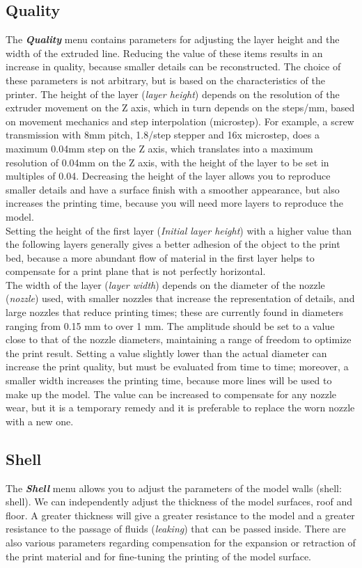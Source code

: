 \subsection{Quality}
The \emph{\textbf{Quality}} menu contains parameters for adjusting the layer height and the width of the extruded line. Reducing the value of these items results in an increase in quality, because smaller details can be reconstructed. The choice of these parameters is not arbitrary, but is based on the characteristics of the printer.
The height of the layer (\emph{layer height}) depends on the resolution of the extruder movement on the Z axis, which in turn depends on the steps/mm, based on movement mechanics and step interpolation (microstep). For example, a screw transmission with 8mm pitch, 1.8/step stepper and 16x microstep, does a maximum 0.04mm step on the Z axis, which translates into a maximum resolution of 0.04mm on the Z axis, with the height of the layer to be set in multiples of 0.04. Decreasing the height of the layer allows you to reproduce smaller details and have a surface finish with a smoother appearance, but also increases the printing time, because you will need more layers to reproduce the model.\\
Setting the height of the first layer (\emph{Initial layer height}) with a higher value than the following layers generally gives a better adhesion of the object to the print bed, because a more abundant flow of material in the first layer helps to compensate for a print plane that is not perfectly horizontal. \\
The width of the layer (\emph{layer width}) depends on the diameter of the nozzle (\emph{nozzle}) used, with smaller nozzles that increase the representation of details, and large nozzles that reduce printing times; these are currently found in diameters ranging from 0.15 mm to over 1 mm. The amplitude should be set to a value close to that of the nozzle diameters, maintaining a range of freedom to optimize the print result. Setting a value slightly lower than the actual diameter can increase the print quality, but must be evaluated from time to time; moreover, a smaller width increases the printing time, because more lines will be used to make up the model. The value can be increased to compensate for any nozzle wear, but it is a temporary remedy and it is preferable to replace the worn nozzle with a new one.

\subsection{Shell}
The \emph{\textbf{Shell}} menu allows you to adjust the parameters of the model walls (shell: shell). We can independently adjust the thickness of the model surfaces, roof and floor. A greater thickness will give a greater resistance to the model and a greater resistance to the passage of fluids (\emph{leaking}) that can be passed inside. There are also various parameters regarding compensation for the expansion or retraction of the print material and for fine-tuning the printing of the model surface.

